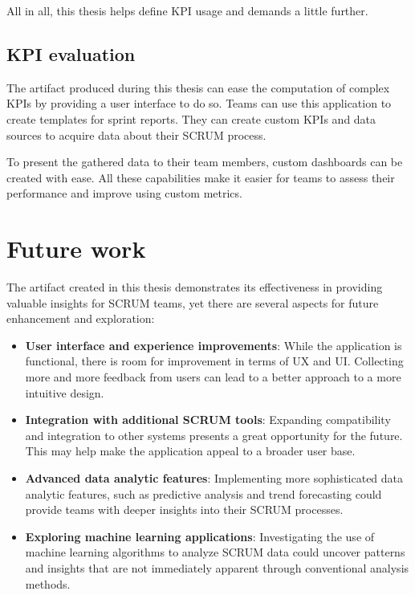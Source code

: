 All in all, this thesis helps define KPI usage and demands a little further.

\subsection{KPI evaluation}

The artifact produced during this thesis can ease the computation of complex KPIs by providing a user interface to do so. 
Teams can use this application to create templates for sprint reports. 
They can create custom KPIs and data sources to acquire data about their SCRUM process. 

To present the gathered data to their team members, custom dashboards can be created with ease. 
All these capabilities make it easier for teams to assess their performance and improve using custom metrics.

\section{Future work}

The artifact created in this thesis demonstrates its effectiveness in providing valuable insights for SCRUM teams, yet there are several aspects for future enhancement and exploration:

\begin{itemize}
    \item \textbf{User interface and experience improvements}: While the application is functional, there is room for improvement in terms of UX and UI. Collecting more and more feedback from users can lead to a better approach to a more intuitive design.
    \item \textbf{Integration with additional SCRUM tools}: Expanding compatibility and integration to other systems presents a great opportunity for the future. This may help make the application appeal to a broader user base.
    \item \textbf{Advanced data analytic features}: Implementing more sophisticated data analytic features, such as predictive analysis and trend forecasting could provide teams with deeper insights into their SCRUM processes.
    \item \textbf{Exploring machine learning applications}: Investigating the use of machine learning algorithms to analyze SCRUM data could uncover patterns and insights that are not immediately apparent through conventional analysis methods.
\end{itemize}

